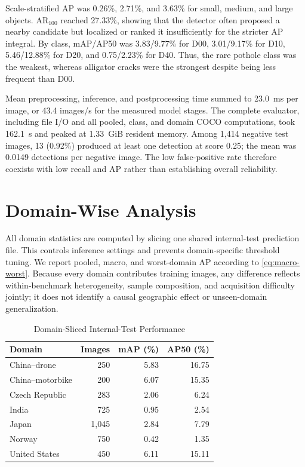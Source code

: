 \documentclass[conference]{ieee-template/vendor/IEEEtran/IEEEtran}
\begin{document}
Scale-stratified AP was 0.26\%, 2.71\%, and 3.63\% for small, medium, and large
objects. AR$_{100}$ reached 27.33\%, showing that the detector often proposed a
nearby candidate but localized or ranked it insufficiently for the stricter AP
integral. By class, mAP/AP50 was 3.83/9.77\% for D00, 3.01/9.17\% for D10,
5.46/12.88\% for D20, and 0.75/2.23\% for D40. Thus, the rare pothole class was
the weakest, whereas alligator cracks were the strongest despite being less
frequent than D00.

Mean preprocessing, inference, and postprocessing time summed to 23.0~ms per
image, or 43.4 images/s for the measured model stages. The complete evaluator,
including file I/O and all pooled, class, and domain COCO computations, took
162.1~s and peaked at 1.33~GiB resident memory. Among 1,414 negative test
images, 13 (0.92\%) produced at least one detection at score 0.25; the mean was
0.0149 detections per negative image. The low false-positive rate therefore
coexists with low recall and AP rather than establishing overall reliability.

\section{Domain-Wise Analysis}
\label{sec:cross-domain}
All domain statistics are computed by slicing one shared internal-test
prediction file. This controls inference settings and prevents domain-specific
threshold tuning. We report pooled, macro, and worst-domain AP according to
\eqref{eq:macro-worst}. Because every domain contributes training images, any
difference reflects within-benchmark heterogeneity, sample composition, and
acquisition difficulty jointly; it does not identify a causal geographic effect
or unseen-domain generalization.

\begin{table}[t]
    \caption{Domain-Sliced Internal-Test Performance}
    \label{tab:domain-results}
    \centering
    \begin{tabular}{lrrr}
        \toprule
        Domain & Images & mAP (\%) & AP50 (\%) \\
        \midrule
        China--drone     & 250   & 5.83 & 16.75 \\
        China--motorbike & 200   & 6.07 & 15.35 \\
        Czech Republic   & 283   & 2.06 &  6.24 \\
        India            & 725   & 0.95 &  2.54 \\
        Japan            & 1,045 & 2.84 &  7.79 \\
        Norway           & 750   & 0.42 &  1.35 \\
        United States    & 450   & 6.11 & 15.11 \\
        \bottomrule
    \end{tabular}
\end{table}
\end{document}
